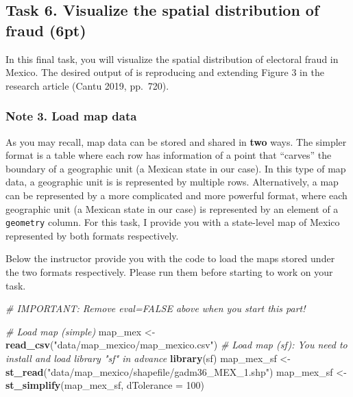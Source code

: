 \documentclass[
]{article}
\newenvironment{Shaded}{\begin{snugshade}}{\end{snugshade}}
\newcommand{\AttributeTok}[1]{\textcolor[rgb]{0.13,0.29,0.53}{#1}}
\newcommand{\CommentTok}[1]{\textcolor[rgb]{0.56,0.35,0.01}{\textit{#1}}}
\newcommand{\DecValTok}[1]{\textcolor[rgb]{0.00,0.00,0.81}{#1}}
\newcommand{\FunctionTok}[1]{\textcolor[rgb]{0.13,0.29,0.53}{\textbf{#1}}}
\newcommand{\NormalTok}[1]{#1}
\newcommand{\OtherTok}[1]{\textcolor[rgb]{0.56,0.35,0.01}{#1}}
\newcommand{\StringTok}[1]{\textcolor[rgb]{0.31,0.60,0.02}{#1}}
\begin{document}
\hypertarget{task-6.-visualize-the-spatial-distribution-of-fraud-6pt}{%
\subsection{Task 6. Visualize the spatial distribution of fraud
(6pt)}\label{task-6.-visualize-the-spatial-distribution-of-fraud-6pt}}

In this final task, you will visualize the spatial distribution of
electoral fraud in Mexico. The desired output of is reproducing and
extending Figure 3 in the research article (Cantu 2019, pp.~720).

\hypertarget{note-3.-load-map-data}{%
\subsubsection{Note 3. Load map data}\label{note-3.-load-map-data}}

As you may recall, map data can be stored and shared in \textbf{two}
ways. The simpler format is a table where each row has information of a
point that ``carves'' the boundary of a geographic unit (a Mexican state
in our case). In this type of map data, a geographic unit is is
represented by multiple rows. Alternatively, a map can be represented by
a more complicated and more powerful format, where each geographic unit
(a Mexican state in our case) is represented by an element of a
\texttt{geometry} column. For this task, I provide you with a
state-level map of Mexico represented by both formats respectively.

Below the instructor provide you with the code to load the maps stored
under the two formats respectively. Please run them before starting to
work on your task.

\begin{Shaded}
\begin{Highlighting}[]
\CommentTok{\# IMPORTANT: Remove eval=FALSE above when you start this part!}

\CommentTok{\# Load map (simple)}
\NormalTok{map\_mex }\OtherTok{\textless{}{-}} \FunctionTok{read\_csv}\NormalTok{(}\StringTok{"data/map\_mexico/map\_mexico.csv"}\NormalTok{)}
\CommentTok{\# Load map (sf): You need to install and load library "sf" in advance}
\FunctionTok{library}\NormalTok{(sf)}
\NormalTok{map\_mex\_sf }\OtherTok{\textless{}{-}} \FunctionTok{st\_read}\NormalTok{(}\StringTok{"data/map\_mexico/shapefile/gadm36\_MEX\_1.shp"}\NormalTok{)}
\NormalTok{map\_mex\_sf }\OtherTok{\textless{}{-}} \FunctionTok{st\_simplify}\NormalTok{(map\_mex\_sf, }\AttributeTok{dTolerance =} \DecValTok{100}\NormalTok{)}
\end{Highlighting}
\end{Shaded}
\end{document}
